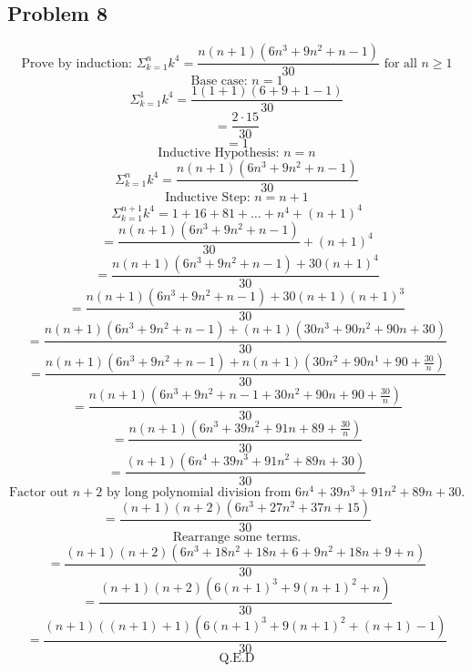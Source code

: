 \documentclass{article}
\begin{document}
\subsection{Problem 8}

$$\text{Prove by induction: } \Sigma_{k=1}^{n} k^4 = \frac{n(n+1)(6n^3 + 9n^2 + n - 1)}{30} \text{ for all } n \ge 1$$
$$\text{Base case: } n = 1 $$
$$\Sigma_{k=1}^{1} k^4 = \frac{1(1+1)(6+9+1-1)}{30}$$
$$= \frac{2\cdot15}{30}$$
$$= 1 $$
$$\text{Inductive Hypothesis: } n = n$$
$$\Sigma_{k=1}^{n} k^4 = \frac{n(n+1)(6n^3 + 9n^2 + n - 1)}{30}$$
$$\text{Inductive Step: } n = n+1$$
$$\Sigma_{k=1}^{n+1} k^4 = 1 + 16 + 81 + \dots + n^4 + (n+1)^4$$
$$= \frac{n(n+1)(6n^3 + 9n^2 + n - 1)}{30} + (n+1)^4$$
$$= \frac{n(n+1)(6n^3 + 9n^2 + n - 1) + 30(n+1)^4}{30} $$
$$= \frac{n(n+1)(6n^3 + 9n^2 + n - 1) + 30(n+1)(n+1)^3}{30} $$
$$= \frac{n(n+1)(6n^3 + 9n^2 + n - 1) + (n+1)(30n^3 + 90n^2 + 90n +30)}{30} $$
$$= \frac{n(n+1)(6n^3 + 9n^2 + n - 1) + n(n+1)(30n^2 + 90n^1 + 90 + \frac{30}{n})}{30} $$
$$= \frac{n(n+1)(6n^3 + 9n^2 + n - 1 + 30n^2 + 90n + 90 + \frac{30}{n})}{30} $$
$$= \frac{n(n+1)(6n^3 + 39n^2 + 91n + 89 + \frac{30}{n})}{30} $$
$$= \frac{(n+1)(6n^4 + 39n^3 + 91n^2 + 89n + 30)}{30} $$
$$\text{Factor out } n + 2 \text{ by long polynomial division from } 6n^4 + 39n^3 + 91n^2 + 89n + 30 \text{.}$$
$$= \frac{(n+1)(n+2)(6n^3 + 27n^2 + 37n + 15)}{30} $$
$$\text{Rearrange some terms.}$$
$$= \frac{(n+1)(n+2)(6n^3 + 18n^2 + 18n + 6 + 9n^2 + 18n + 9 + n)}{30} $$
$$= \frac{(n+1)(n+2)(6(n+1)^3 + 9(n+1)^2 + n)}{30} $$
$$= \frac{(n+1)((n + 1) + 1)(6(n+1)^3 + 9(n+1)^2 + (n + 1) - 1)}{30} $$
$$\text{Q.E.D}$$
\end{document}
